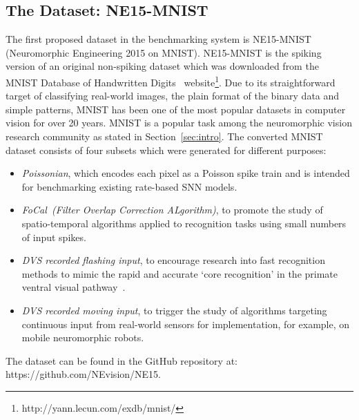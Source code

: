 \subsection{The Dataset: NE15-MNIST}
\label{sec:data}
The first proposed dataset in the benchmarking system is NE15-MNIST (Neuromorphic Engineering 2015 on MNIST).
NE15-MNIST is the spiking version of an original non-spiking dataset which was downloaded from the MNIST Database of Handwritten Digits~\cite{lecun1998gradient}  website\footnote{http://yann.lecun.com/exdb/mnist/}.
Due to its straightforward target of classifying real-world images, the plain format of the binary data and simple patterns, MNIST has been one of the most popular datasets in computer vision for over 20 years.
MNIST is a popular task among the neuromorphic vision research community as stated in Section~\ref{sec:intro}.
The converted MNIST dataset consists of four subsets which were generated for different purposes:
\begin{itemize}
	\item \textit{Poissonian},
	which encodes each pixel as a Poisson spike train and is intended for benchmarking existing rate-based SNN models.
	\item \textit{FoCal~(Filter Overlap Correction ALgorithm)},
	to promote the study of spatio-temporal algorithms applied to recognition tasks using small numbers of input spikes.
	\item \textit{DVS recorded flashing input},
	to encourage research into fast recognition methods to mimic the rapid and accurate `core recognition' in the primate ventral visual pathway~\cite{dicarlo2012does}.
	\item \textit{DVS recorded moving input},
	to trigger the study of algorithms targeting continuous input from real-world sensors for implementation, for example, on mobile neuromorphic robots.
\end{itemize}
The dataset can be found in the GitHub repository at: https://github.com/NEvision/NE15.
